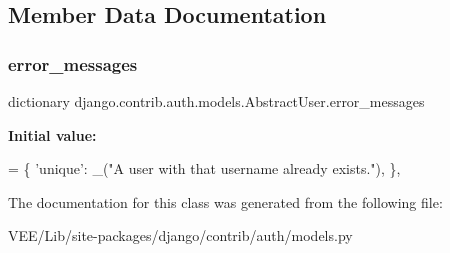 \subsection{Member Data Documentation}
\mbox{\label{classdjango_1_1contrib_1_1auth_1_1models_1_1_abstract_user_a017bec74b22eeb56a92cfd6d26b9ebf4}} 
\subsubsection{\texorpdfstring{error\+\_\+messages}{error\_messages}}
{\footnotesize\ttfamily dictionary django.\+contrib.\+auth.\+models.\+Abstract\+User.\+error\+\_\+messages\hspace{0.3cm}{\ttfamily [static]}}

{\bfseries Initial value\+:}
\begin{DoxyCode}
= \{
            \textcolor{stringliteral}{'unique'}: \_(\textcolor{stringliteral}{"A user with that username already exists."}),
        \},
\end{DoxyCode}


The documentation for this class was generated from the following file\+:\begin{DoxyCompactItemize}
\item 
V\+E\+E/\+Lib/site-\/packages/django/contrib/auth/models.\+py\end{DoxyCompactItemize}

